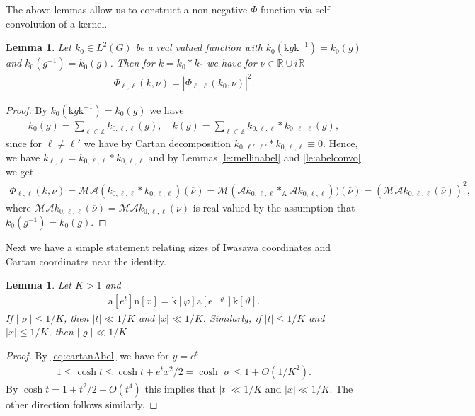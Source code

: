 \documentclass[12pt]{amsart}
\newtheorem{lemma}[theorem]{Lemma}
\theoremstyle{definition}
\theoremstyle{remark}
\numberwithin{equation}{section}
\newcommand{\A}{\mathcal{A}}
\newcommand{\R}{{\mathbb R}}
\newcommand{\Z}{{\mathbb Z}}
\newcommand{\1}{{\mathbf 1}}
\renewcommand{\a}{\mathrm{a}}
\newcommand{\n}{\mathrm{n}}
\renewcommand{\k}{\mathrm{k}}
\renewcommand{\n}{\mathrm{n}}
\begin{document}
The above lemmas allow us to construct a non-negative $\Phi$-function via self-convolution of a kernel.
\begin{lemma} \label{le:convosquare}
    Let $k_0\in L^2(G)$ be a real valued function with $k_0(\mathrm{k} g \mathrm{k}^{-1})= k_0(g)$ and  $k_0(g^{-1})=k_0(g)$. Then for $k=k_0 \ast k_0$ we have for $\nu \in \R \cup i\R$ 
    \begin{align*}
        \Phi_{\ell,\ell}(k,\nu) = |\Phi_{\ell,\ell}(k_0,\nu) |^2.
    \end{align*}
\end{lemma}
\begin{proof}
By $k_0(\mathrm{k} g \mathrm{k}^{-1})= k_0(g)$ we have
  \begin{align*}
   k_0(g) = \sum_{\ell \in \Z}    k_{0,\ell,\ell}(g) , \quad     k(g) = \sum_{\ell \in \Z}    k_{0,\ell,\ell} \ast  k_{0,\ell,\ell}(g),
  \end{align*}
  since for $\ell\neq \ell'$ we have by Cartan decomposition $k_{0,\ell',\ell'} \ast k_{0,\ell,\ell}\equiv 0$. Hence, we have $k_{\ell,\ell} =k_{0,\ell,\ell} \ast k_{0,\ell,\ell} $ and by Lemmas \ref{le:mellinabel} and \ref{le:abelconvo} we get
  \begin{align*}
       \Phi_{\ell,\ell}(k,\nu) = \mathcal{M} \A  (k_{0,\ell,\ell} \ast k_{0,\ell,\ell}) (\overline{\nu}) =  \mathcal{M} (\A  k_{0,\ell,\ell}  \ast_\mathrm{A} \A k_{0,\ell,\ell})) (\overline{\nu}) = (\mathcal{M} \A  k_{0,\ell,\ell}  (\overline{\nu}) )^2,
  \end{align*}
  where $\mathcal{M} \A  k_{0,\ell,\ell}  (\overline{\nu})=\mathcal{M} \A  k_{0,\ell,\ell}  (\nu)$ is real valued by the assumption that $k_0(g^{-1})=k_0(g)$.
\end{proof}
Next we have a simple statement relating sizes of Iwasawa coordinates and Cartan coordinates near the identity.
\begin{lemma} \label{le:yvsvarrho}
  Let $K > 1$ and 
    \begin{align*}
        \a[e^t] \n[x] = \k[\varphi] \a[e^{-\varrho}] \k[\vartheta].
    \end{align*}
    If $|\varrho|  \leq 1/K$, then $|t| \ll 1/K$ and  $|x| \ll 1/K$. Similarly, if $|t| \leq 1/K$ and  $|x| \leq 1/K$, then $|\varrho|  \ll 1/K$
\end{lemma}
\begin{proof}
    By \eqref{eq:cartanAbel} we have for $y= e^t$
    \begin{align*}
    1 \leq  \cosh t  \leq   \cosh t + e^{t} x^2  /2 =  \cosh \varrho  \leq 1+O(1/K^2).
    \end{align*}
   By  $\cosh t  = 1+t^2/2 + O(t^4)$ this implies that $ |t| \ll 1/K$ and $|x| \ll 1/K$. The other direction follows similarly.
\end{proof}
\end{document}

